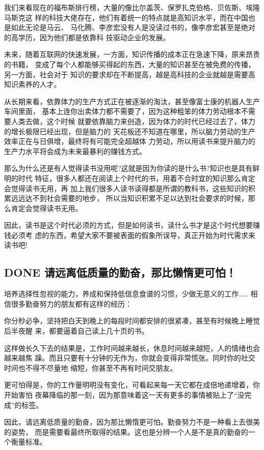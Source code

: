 \documentclass[11pt]{ctexart}
\begin{document}
{{{{我们来看现在的福布斯排行榜，大量的像比尔盖茨、保罗扎克伯格、贝佐斯、埃隆马斯克这
样的科技大佬存在，他们有着统一的特点就是高知识水平，而在中国也是如此无论是马云、
马化腾、李彦宏没有人是没读过书的，像李彦宏甚至是绝对的高学历，因为他们都是依靠科
技驱动企业的发展。

未来，随着互联网的快速发展，一方面，知识传播的成本正在急速下降，原来昂贵的书籍，
变成了每个人都能够买得起的东西，大量的知识甚至在被免费的传播，另一方面，社会对于
知识的要求却在不断提高，越是高科技的企业就越是需要高知识素养的人才。

从长期来看，依靠体力的生产方式正在被逐渐的淘汰，甚至像富士康的机器人生产车间里面，
基本上连你出卖体力都不需要了，因为这种粗笨的体力劳动根本不需要人类去做，这个时候
就要依靠脑力来创造，因为体力的时代已经过去了，体力的增长极限已经出现，但是脑力的
天花板还不知道在哪里，所以脑力劳动的生产效率正在与日俱增，最终将有可能完全超越体
力劳动，所以用读书来提升脑力的生产力水平将会成为未来最暴利的赚钱方式。

那么为什么还是有人觉得读书没用呢?这就是因为你读的是什么书?知识也是具有鲜明的时代
特征，很多人都还在阅读上个时代的书，用着不合时宜的知识那么肯定会觉得读书无用，再
加上我们很多人读书读得都是所谓的教科书，这些知识的积累远远达不到社会需要的地步，
所以当知识积累不足以达到社会要求的时候，那么肯定会觉得读书无用。

因此，读书是这个时代必须的方式，但是如何读书，读什么书才是这个时代想要赚钱必须考
虑的东西，希望大家不要被表面的假象所误导，真正开始为时代需求来读书吧!

\subsection{{\bfseries\sffamily DONE} 请远离低质量的勤奋，那比懒惰更可怕！}
\label{sec:orgdcb446c}
培养选择性忽视的能力，养成和保持低信息食谱的习惯，少做无意义的工作……
相信很多勤奋努力的朋友都有这样的经历：

你分秒必争，坚持把白天到晚上的每段时间都安排的很紧凑，甚至有时候晚上睡觉后半夜醒
来，都要逼着自己读上几十页的书。

这样做长久下去的结果是，工作时间越来越长，休息时间越来越短，人的情绪也会越来越焦
躁。而且只要有十分钟的无作为，你就会变得非常慌张。同时你的社交时间也不得不尽量地
缩短，你甚至不再有时间交朋友。

更可怕得是，你的工作量明明没有变化，可看起来每一天它都在成倍地递增着，你开始害怕
夜幕降临的那一刻，因为那意味着这一天有更多的事情被贴上了“没完成”的标签。

因此，请远离低质量的勤奋，因为那比懒惰更可怕。勤奋努力不是一种看上去很美的姿势，
而是需要看最终所取得的结果。这也是分辨一个人是不是真的勤奋的一个衡量标准。


}}}}
\end{document}
